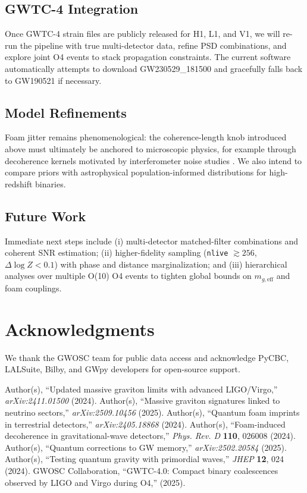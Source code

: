 \documentclass[12pt]{article}
\begin{document}
\subsection{GWTC-4 Integration}
Once GWTC-4 strain files are publicly released for H1, L1, and V1, we will re-run the pipeline with true multi-detector data, refine PSD combinations, and explore joint O4 events to stack propagation constraints. The current software automatically attempts to download GW230529\_181500 and gracefully falls back to GW190521 if necessary.

\subsection{Model Refinements}
Foam jitter remains phenomenological: the coherence-length knob introduced above must ultimately be anchored to microscopic physics, for example through decoherence kernels motivated by interferometer noise studies \cite{PhysRevD110026008}. We also intend to compare priors with astrophysical population-informed distributions for high-redshift binaries.

\subsection{Future Work}
Immediate next steps include (i) multi-detector matched-filter combinations and coherent SNR estimation; (ii) higher-fidelity sampling (\texttt{nlive} $\gtrsim 256$, $\Delta \log Z < 0.1$) with phase and distance marginalization; and (iii) hierarchical analyses over multiple O(10) O4 events to tighten global bounds on $m_{g,\mathrm{eff}}$ and foam couplings.

\section*{Acknowledgments}
We thank the GWOSC team for public data access and acknowledge PyCBC, LALSuite, Bilby, and GWpy developers for open-source support.

\begin{thebibliography}{99}
 Author(s), ``Updated massive graviton limits with advanced LIGO/Virgo,'' \emph{arXiv:2411.01500} (2024).
 Author(s), ``Massive graviton signatures linked to neutrino sectors,'' \emph{arXiv:2509.10456} (2025).
 Author(s), ``Quantum foam imprints in terrestrial detectors,'' \emph{arXiv:2405.18868} (2024).
 Author(s), ``Foam-induced decoherence in gravitational-wave detectors,'' \emph{Phys. Rev. D} \textbf{110}, 026008 (2024).
 Author(s), ``Quantum corrections to GW memory,'' \emph{arXiv:2502.20584} (2025).
 Author(s), ``Testing quantum gravity with primordial waves,'' \emph{JHEP} \textbf{12}, 024 (2024).
 GWOSC Collaboration, ``GWTC-4.0: Compact binary coalescences observed by LIGO and Virgo during O4,'' (2025).
\end{thebibliography}
\end{document}
